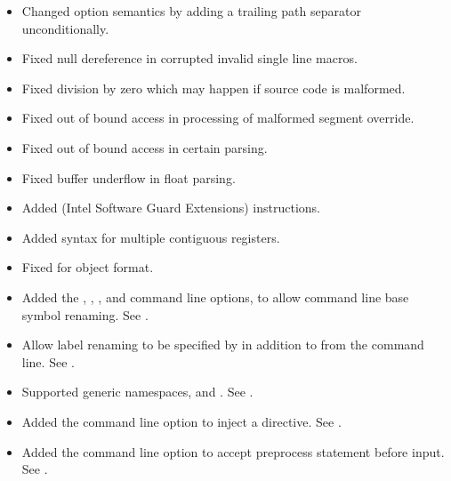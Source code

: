 
\begin{itemize}
    \item{Changed  option semantics by adding a trailing path
        separator unconditionally.}

    \item{Fixed null dereference in corrupted invalid single line macros.}

    \item{Fixed division by zero which may happen if source code is malformed.}

    \item{Fixed out of bound access in processing of malformed segment override.}

    \item{Fixed out of bound access in certain  parsing.}

    \item{Fixed buffer underflow in float parsing.}

    \item{Added  (Intel Software Guard Extensions) instructions.}

    \item{Added  syntax for multiple contiguous registers.}

    \item{Fixed  for  object format.}

    \item{Added the , , , and
         command line options, to allow command line base symbol
        renaming. See .}

    \item{Allow label renaming to be specified by  in addition to
        from the command line. See .}

    \item{Supported generic  namespaces,  and .
        See .}

    \item{Added the  command line option to inject a 
        directive. See .}

    \item{Added the  command line option to accept preprocess
        statement before input. See .}


\end{itemize}
